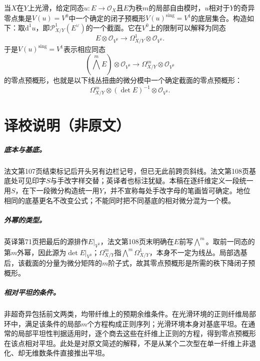 \documentclass[openany,fontset=fandol]{ctexbook}
\newcommand{\Oa}{\mathcal O}
\begin{document}
当$X$在$Y$上光滑，给定同态$u:E\to\Oa_X$且$E$为秩$m$的局部自由模时，$u$相对于$Y$的奇异零点集是$V(u)=V^0$中一个确定的闭子预概形$V(u)^{\mathrm{sing}}=V^1$的底层集合。构造如下：取$\mathrm d^1u$，即$\mathcal P^1_{X/Y}(E^\vee)$的一个截面。它在$V^0$上的限制可以解释为同态
\[
E\otimes\Oa_{V^0}\longrightarrow
\Omega^1_{X/Y}\otimes\Oa_{V^0}.
\]
于是$V(u)^{\mathrm{sing}}=V^1$表示相应同态
\[
(\bigwedge^m E)\otimes\Oa_{V^0}\longrightarrow
\Omega^m_{X/Y}\otimes\Oa_{V^0}
\]
的零点预概形，也就是以下线丛扭曲的微分模中一个确定截面的零点预概形：
\[
\Omega^m_{X/Y}\otimes(\det E)^{-1}\otimes\Oa_{V^0}.
\]
\chapter*{译校说明（非原文）}
\paragraph{底本与基底。}
法文第107页结束标记后开头另有边栏记号，但已无此前跨页斜线。法文第108页基底处可见印字$S$与手改字样交替；英译者也标注犹疑。本稿在逐纤维定义一段统一用$S$，在下一段微分构造统一用$Y$，并不宣称每处手改字母的笔画皆可确定。地位相同的底基更名不改变公式；不能同时把不同基底的相对微分混为一个模。

\paragraph{外幂的类型。}
英译第71页把最后的源排作$E|_{V^0}$，法文第108页末明确在$E$前写$\bigwedge^m$。取前一同态的第$m$外幂，因此源为$\det E|_{V^0}$；$\Omega^m_{X/Y}$指$\bigwedge^m\Omega^1_{X/Y}$，本身不一定为线丛。局部选基后，该截面的分量为微分矩阵的$m$阶子式，故其零点预概形是所需的秩下降闭子预概形。

\paragraph{相对平坦的条件。}
非超奇异包括前文两类，均带纤维上的预期余维条件。在光滑环境的正则纤维局部环中，满足该条件的局部$m$个方程构成正则序列；光滑环境本身对基底平坦。在通常的局部平坦性判据适用时，逐个商去这些在纤维上正则的方程，得到零点预概形在该点相对平坦。此处是对原文简述的解释，不是从某个二次型在单一纤维上非退化、却无维数条件直接推出平坦。
\end{document}

